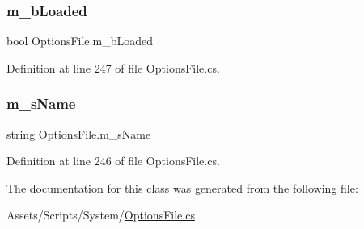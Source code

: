 \subsubsection{\texorpdfstring{m\+\_\+b\+Loaded}{m\_bLoaded}}
{\footnotesize\ttfamily bool Options\+File.\+m\+\_\+b\+Loaded}



Definition at line 247 of file Options\+File.\+cs.

\mbox{\label{class_options_file_af9eef6052dd0b04288f80620f4c761b2}} 
\subsubsection{\texorpdfstring{m\+\_\+s\+Name}{m\_sName}}
{\footnotesize\ttfamily string Options\+File.\+m\+\_\+s\+Name}



Definition at line 246 of file Options\+File.\+cs.



The documentation for this class was generated from the following file\+:\begin{DoxyCompactItemize}
\item 
Assets/\+Scripts/\+System/\mbox{\hyperlink{_options_file_8cs}{Options\+File.\+cs}}\end{DoxyCompactItemize}
